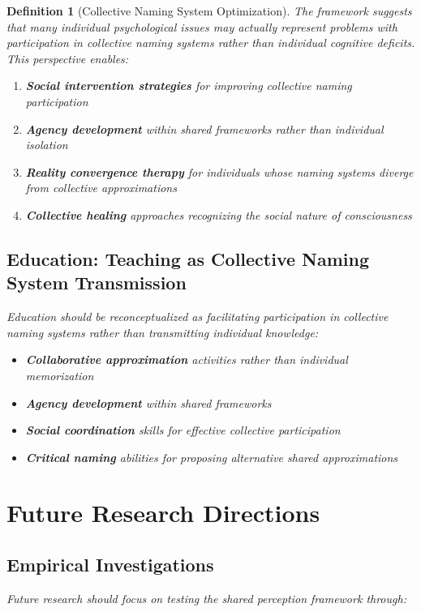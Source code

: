 \documentclass[12pt]{article}
\newtheorem{definition}{Definition}
\begin{document}
\begin{definition}[Collective Naming System Optimization]
The framework suggests that many individual psychological issues may actually represent problems with participation in collective naming systems rather than individual cognitive deficits. This perspective enables:

\begin{enumerate}
\item \textbf{Social intervention strategies} for improving collective naming participation
\item \textbf{Agency development} within shared frameworks rather than individual isolation
\item \textbf{Reality convergence therapy} for individuals whose naming systems diverge from collective approximations
\item \textbf{Collective healing} approaches recognizing the social nature of consciousness
\end{enumerate}

\subsection{Education: Teaching as Collective Naming System Transmission}

Education should be reconceptualized as facilitating participation in collective naming systems rather than transmitting individual knowledge:

\begin{itemize}
\item \textbf{Collaborative approximation} activities rather than individual memorization
\item \textbf{Agency development} within shared frameworks
\item \textbf{Social coordination} skills for effective collective participation
\item \textbf{Critical naming} abilities for proposing alternative shared approximations
\end{itemize}

\section{Future Research Directions}

\subsection{Empirical Investigations}

Future research should focus on testing the shared perception framework through:


\end{definition}
\end{document}

